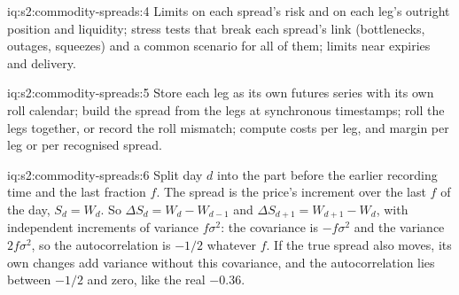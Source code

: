 \begin{solution}{iq:s2:commodity-spreads:4}
Limits on each spread's risk and on each leg's outright position and liquidity; stress tests that break each spread's link (bottlenecks, outages,
squeezes) and a common scenario for all of them; limits near expiries and delivery.
\end{solution}

\begin{solution}{iq:s2:commodity-spreads:5}
Store each leg as its own futures series with its own roll calendar; build the spread from the legs at synchronous timestamps; roll the legs
together, or record the roll mismatch; compute costs per leg, and margin per leg or per recognised spread.
\end{solution}

\begin{solution}{iq:s2:commodity-spreads:6}
Split day $d$ into the part before the earlier recording time and the last fraction $f$. The spread is the price's increment over the last $f$ of the
day, $S_d = W_d$. So $\Delta S_d = W_d - W_{d-1}$ and $\Delta S_{d+1} = W_{d+1} - W_d$, with independent increments of variance $f\sigma^2$: the
covariance is $-f\sigma^2$ and the variance $2f\sigma^2$, so the autocorrelation is $-1/2$ whatever $f$. If the true spread also moves, its own changes
add variance without this covariance, and the autocorrelation lies between $-1/2$ and zero, like the real $-0.36$.
\end{solution}
